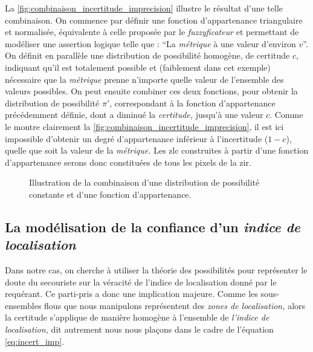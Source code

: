 {La \autoref{fig:combinaison_incertitude_imprecision} illustre le
résultat d'une telle combinaison. On commence par définir une fonction
d'appartenance triangulaire et normalisée, équivalente à celle
proposée par le \emph{fuzzyficateur}  et
permettant de modéliser une assertion logique telle que : \enquote{La
  \emph{métrique} à une valeur d'environ \(v\)}. On définit en
parallèle une distribution de possibilité homogène, de certitude
\(c\), indiquant qu'il est totalement possible et (faiblement dans cet
exemple) nécessaire que la \emph{métrique} prenne n'importe quelle
valeur de l'ensemble des valeurs possibles. On peut ensuite combiner
ces deux fonctions, pour obtenir la distribution de possibilité
\(\pi'\), correspondant à la fonction d’appartenance précédemment
définie, dont a diminué la \emph{certitude,} jusqu'à une valeur
\(c\). Comme le montre clairement la
\autoref{fig:combinaison_incertitude_imprecision}, il est ici
impossible d'obtenir un degré d'appartenance inférieur à l'incertitude
(\(1-c\)), quelle que soit la valeur de la \emph{métrique.} Les
\ac{zlc} construites à partir d'une fonction d'appartenance serons
donc constituées de tous les pixels de la \ac{zir}.

\begin{figure}
  \centering
  
  \caption{Illustration de la combinaison d'une distribution de
    possibilité constante et d'une fonction d'appartenance.}
  \label{fig:combinaison_incertitude_imprecision}
\end{figure}

\subsection{La modélisation de la confiance d'un \emph{indice de
    localisation}}

Dans notre cas, on cherche à utiliser la théorie des possibilités pour
représenter le doute du secouriste sur la véracité de l'indice de
localisation donné par le requérant. Ce parti-pris a donc une
implication majeure. Comme les sous-ensembles flous que nous
manipulons représentent des \emph{zones de localisation,} alors la
certitude s'applique de manière homogène à l'ensemble de
\emph{l'indice de localisation,} dit autrement nous nous plaçons dans
le cadre de l'équation \ref{eq:incert_imp}.

}
